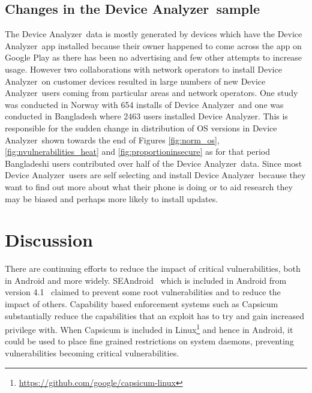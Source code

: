 \documentclass[conference,a4paper,twoside]{IEEEtran}
\newcommand{\da}{Device Analyzer}
\begin{document}
\subsection{Changes in the \da\ sample}
\label{sec:da_changes}
The \da\ data is mostly generated by devices which have the \da\ app installed because their owner happened to come across the app on Google Play as there has been no advertising and few other attempts to increase usage.
However two collaborations with network operators to install \da\ on customer devices resulted in large numbers of new \da\ users coming from particular areas and network operators.
One study was conducted in Norway with 654 installs of \da\ and one was conducted in Bangladesh where 2463 users installed \da.
This is responsible for the sudden change in distribution of OS versions in \da\ shown towards the end of Figures \ref{fig:norm_os}, \ref{fig:nvulnerabilities_heat} and \ref{fig:proportioninsecure} as for that period Bangladeshi users contributed over half of the \da\ data.
Since most \da\ users are self selecting and install \da\ because they want to find out more about what their phone is doing or to aid research they may be biased and perhaps more likely to install updates.


\section{Discussion}
There are continuing efforts to reduce the impact of critical vulnerabilities, both in Android and more widely.
SEAndroid~\cite{Smalley2013} which is included in Android from version 4.1~\cite{jelly-bean-release} claimed to prevent some root vulnerabilities and to reduce the impact of others.
Capability based enforcement systems such as Capsicum~\cite{Watson2010} substantially reduce the capabilities that an exploit has to try and gain increased privilege with.
When Capsicum is included in Linux\footnote{\url{https://github.com/google/capsicum-linux}} and hence in Android, it could be used to place fine grained restrictions on system daemons, preventing vulnerabilities becoming critical vulnerabilities.
\end{document}
